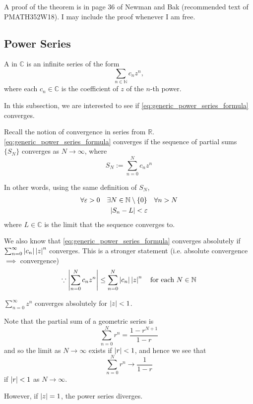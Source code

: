 \documentclass[11pt, oneside]{book}
\begin{document}
A proof of the theorem is in page 36 of Newman and Bak (recommended text of PMATH352W18). I may include the proof whenever I am free.


\subsection{Power Series} %
\label{sub:power_series}

\begin{defn}\label{defn:power_series}
	A  in $\mathbb{C}$ is an infinite series of the form
	\begin{equation}\label{eq:generic_power_series_formula}
		\sum_{n \in \mathbb{N}} c_n z^n,
	\end{equation}
	where each $c_n \in \mathbb{C}$ is the coefficient of $z$ of the $n$-th power.
\end{defn}

In this subsection, we are interested to see if \cref{eq:generic_power_series_formula} converges.

Recall the notion of convergence in series from $\mathbb{R}$. \cref{eq:generic_power_series_formula} converges if the sequence of partial sums $\{S_N\}$ converges as $N \to \infty$, where
\begin{equation*}
	S_N := \sum_{n = 0}^{N} c_n z^n
\end{equation*}

In other words, using the same definition of $S_N$,
\begin{gather*}
	\forall \varepsilon > 0 \quad \exists N \in \mathbb{N} \setminus	\{0\} \quad \forall n > N \\
	\left|S_n - L\right| < \varepsilon
\end{gather*}
where $L \in \mathbb{C}$ is the limit that the sequence converges to.

We also know that \cref{eq:generic_power_series_formula} converges absolutely if $\sum_{n = 0}^{\infty} \left|c_n\right| \left|z\right|^n$ converges. This is a stronger statement (i.e. absolute convergence $\implies$ convergence)
\begin{equation*}
	\because \left|\sum_{n = 0}^{N} c_n z^n\right| \leq \sum_{n = 0}^{N} \left|c_n\right| \left|z\right|^n \quad \text{for each } N \in \mathbb{N}
\end{equation*}

\begin{eg}
	$\sum_{n = 0}^{\infty} z^n$ converges absolutely for $\left|z\right| < 1$.

	Note that the partial sum of a geometric series is
	\begin{equation*}
		\sum_{n = 0}^{N} r^n = \frac{1 - r^{N + 1}}{1 - r}
	\end{equation*}
	and so the limit as $N \to \infty$ exists if $\left|r\right| < 1$, and hence we see that
	\begin{equation*}
		\sum_{n = 0}^{N} r^n \to \frac{1}{1 - r} 
	\end{equation*}
	if $\left|r\right| < 1$ as $N \to \infty$.

	However, if $\left|z\right| = 1$, the power series diverges.
\end{eg}
\end{document}
